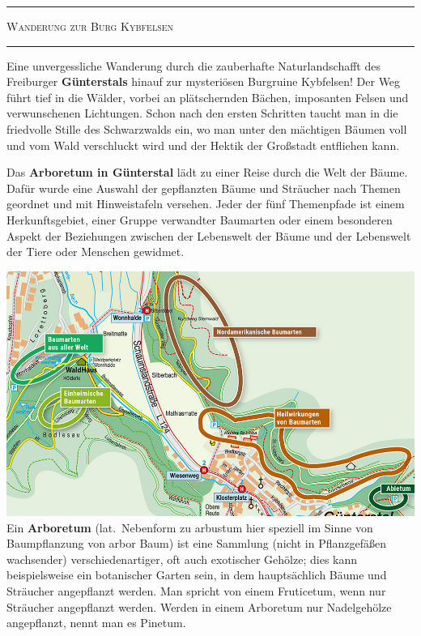 \documentclass[landscape, a4paper]{article}
\newcommand\alert[1]{\textcolor{PrimaryColor}{\textbf{#1}}}
\begin{document}
\footnotesize
\begin{minipage}[t]{0.32\textwidth}
	\setlength{\parskip}{0.25cm}

	\vspace{0.5cm}

		\textcolor{PrimaryColor}{
			\rule{\linewidth}{0.5mm}
			\vspace{-0.1cm}
			\begin{center}
				\large
				\textsc{Wanderung zur Burg Kybfelsen}
			\end{center}
			\rule{\linewidth}{0.5mm}
		}
		\vspace{0.15cm}

		Eine unvergessliche Wanderung durch die zauberhafte Naturlandschafft des Freiburger \alert{Günterstals} hinauf zur mysteriösen Burgruine Kybfelsen! Der Weg führt tief in die Wälder, vorbei an plätschernden Bächen, imposanten Felsen und verwunschenen Lichtungen. Schon nach den ersten Schritten taucht man in die friedvolle Stille des Schwarzwalds ein, wo man unter den mächtigen Bäumen voll und vom Wald verschluckt wird und der Hektik der Großstadt entfliehen kann.

		Das \alert{Arboretum in Günterstal} lädt zu einer Reise durch die Welt der Bäume. Dafür wurde eine Auswahl der gepflanzten Bäume und Sträucher nach Themen geordnet und mit Hinweistafeln versehen. Jeder der fünf Themenpfade ist einem Herkunftsgebiet, einer Gruppe verwandter Baumarten oder einem besonderen Aspekt der Beziehungen zwischen der Lebenswelt der Bäume und der Lebenswelt der Tiere oder Menschen gewidmet.

		\includegraphics[width=\linewidth]{./figures/arboretum.png}
		\setlength{\parskip}{0.25cm}
		\vspace{0.15cm}
		Ein \alert{Arboretum} (lat.\ Nebenform zu arbustum hier speziell im Sinne von Baumpflanzung von arbor Baum) ist eine Sammlung (nicht in Pflanzgefäßen wachsender) verschiedenartiger, oft auch exotischer Gehölze; dies kann beispielsweise ein botanischer Garten sein, in dem hauptsächlich Bäume und Sträucher angepflanzt werden. Man spricht von einem Fruticetum, wenn nur Sträucher angepflanzt werden. Werden in einem Arboretum nur Nadelgehölze angepflanzt, nennt man es Pinetum.
\end{minipage}
\end{document}
